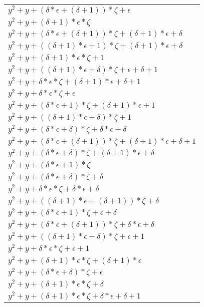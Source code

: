 \documentclass[12pt]{article}
\begin{document}
\begin{center}
\begin{longtable}{|l|}
	$y^2 + y + (\delta*\epsilon + (\delta + 1))*\zeta + \epsilon$ \\
	$y^2 + y + (\delta + 1)*\epsilon*\zeta$ \\
	$y^2 + y + (\delta*\epsilon + (\delta + 1))*\zeta + (\delta + 1)*\epsilon + \delta$ \\
	$y^2 + y + ((\delta + 1)*\epsilon + 1)*\zeta + (\delta + 1)*\epsilon + \delta$ \\
	$y^2 + y + (\delta + 1)*\epsilon*\zeta + 1$ \\
	$y^2 + y + ((\delta + 1)*\epsilon + \delta)*\zeta + \epsilon + \delta + 1$ \\
	$y^2 + y + \delta*\epsilon*\zeta + (\delta + 1)*\epsilon + \delta + 1$ \\
	$y^2 + y + \delta*\epsilon*\zeta + \epsilon$ \\
	$y^2 + y + (\delta*\epsilon + 1)*\zeta + (\delta + 1)*\epsilon + 1$ \\
	$y^2 + y + ((\delta + 1)*\epsilon + \delta)*\zeta + 1$ \\
	$y^2 + y + (\delta*\epsilon + \delta)*\zeta + \delta*\epsilon + \delta$ \\
	$y^2 + y + (\delta*\epsilon + (\delta + 1))*\zeta + (\delta + 1)*\epsilon + \delta + 1$ \\
	$y^2 + y + (\delta*\epsilon + \delta)*\zeta + (\delta + 1)*\epsilon + \delta$ \\
	$y^2 + y + (\delta*\epsilon + 1)*\zeta$ \\
	$y^2 + y + (\delta*\epsilon + \delta)*\zeta + \delta$ \\
	$y^2 + y + \delta*\epsilon*\zeta + \delta*\epsilon + \delta$ \\
	$y^2 + y + ((\delta + 1)*\epsilon + (\delta + 1))*\zeta + \delta$ \\
	$y^2 + y + (\delta*\epsilon + 1)*\zeta + \epsilon + \delta$ \\
	$y^2 + y + (\delta*\epsilon + (\delta + 1))*\zeta + \delta*\epsilon + \delta$ \\
	$y^2 + y + ((\delta + 1)*\epsilon + \delta)*\zeta + \epsilon + 1$ \\
	$y^2 + y + \delta*\epsilon*\zeta + \epsilon + 1$ \\
	$y^2 + y + (\delta + 1)*\epsilon*\zeta + (\delta + 1)*\epsilon$ \\
	$y^2 + y + (\delta*\epsilon + \delta)*\zeta + \epsilon$ \\
	$y^2 + y + (\delta + 1)*\epsilon*\zeta + \delta$ \\
	$y^2 + y + (\delta + 1)*\epsilon*\zeta + \delta*\epsilon + \delta + 1$ \\

\end{longtable}
\end{center}
\end{document}
